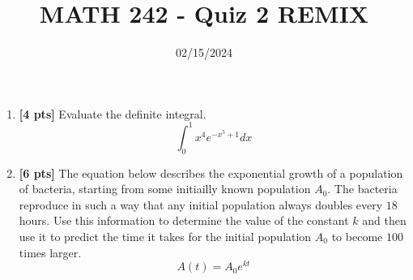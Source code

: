 \documentclass[12pt]{article}
\title{MATH 242 - Quiz 2 REMIX}
\date{02/15/2024}
\begin{document}
\maketitle


\begin{enumerate}

\item \textbf{[4 pts]} Evaluate the definite integral. $$\int_{0}^1x^4e^{-x^5+1}dx$$


\pagebreak

\item \textbf{[6 pts]} The equation below describes the exponential growth of a population of bacteria, starting from some initiailly known population $A_0$. The bacteria reproduce in such a way that any initial population always doubles every $18$ hours. Use this information to determine the value of the constant $k$ and then use it to predict the time it takes for the initial population $A_0$ to become $100$ times larger. $$A(t)=A_0e^{kt}$$



\end{enumerate}
\end{document}

